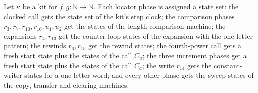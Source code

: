 \begin{definition}
\label{Turing.NTimeDiag.QyLPh}
\leanok
{}
Let $\kappa$ be a kit for $f, g : \mathbb{N} \to \mathbb{N}$. Each locator phase is assigned a
state set: the clocked call gets the state set of the kit's step clock; the comparison phases
$r_3, r_7, r_{10}, r_{16}, u_1, u_2$ get the states of the length-comparison machine; the
expansions $r_4, r_{13}$ get the counter-loop states of the expansion with the one-letter pattern;
the rewinds $r_6, r_{15}$ get the rewind states; the fourth-power call gets a fresh start state
plus the states of the call $C_u$; the three increment phases get a fresh start state plus the
states of the call $C_a$; the write $r_{14}$ gets the constant-writer states for a one-letter word;
and every other phase gets the sweep states of the copy, transfer and clearing machines.
\end{definition}

